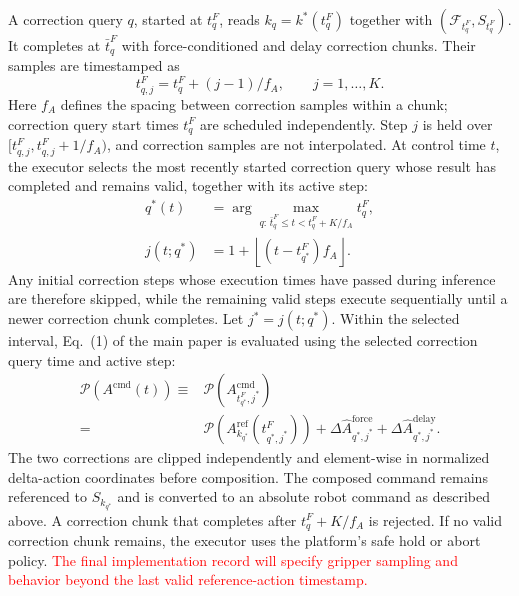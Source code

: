\documentclass[conference]{IEEEtran}
\newcommand{\assumed}[1]{\textcolor{red}{#1}}
\begin{document}
A correction query $q$, started at $t_q^F$, reads $k_q=k^*(t_q^F)$ together with $(\mathcal F_{t_q^F},S_{t_q^F})$. It completes at $\bar t_q^F$ with force-conditioned and delay correction chunks. Their samples are timestamped as
\begin{equation}
    t^F_{q,j}=t_q^F+(j-1)/f_A,
    \qquad j=1,\ldots,K.
    \label{eq:supp_correction_timestamps}
\end{equation}
Here $f_A$ defines the spacing between correction samples within a chunk; correction query start times $t_q^F$ are scheduled independently. Step $j$ is held over $[t^F_{q,j},t^F_{q,j}+1/f_A)$, and correction samples are not interpolated. At control time $t$, the executor selects the most recently started correction query whose result has completed and remains valid, together with its active step:
\begin{equation}
\begin{aligned}
    q^*(t)&=\arg\max_{q:\,\bar t_q^F\leq t<t_q^F+K/f_A}t_q^F,\\
    j(t;q^*)&=1+\left\lfloor(t-t_{q^*}^F)f_A\right\rfloor.
\end{aligned}
    \label{eq:supp_active_correction_step}
\end{equation}
Any initial correction steps whose execution times have passed during inference are therefore skipped, while the remaining valid steps execute sequentially until a newer correction chunk completes. Let $j^*=j(t;q^*)$. Within the selected interval, Eq.~(1) of the main paper is evaluated using the selected correction query time and active step:
\begin{equation}
\begin{aligned}
    \mathcal P(A^{\mathrm{cmd}}(t))
    \equiv{}&\mathcal P(A^{\mathrm{cmd}}_{t_{q^*}^F,j^*})\\
    ={}&\mathcal P\!\left(A_{k_{q^*}}^{\mathrm{ref}}
        (t^F_{q^*,j^*})\right)
      +\Delta\hat A^{\mathrm{force}}_{q^*,j^*}
      +\Delta\hat A^{\mathrm{delay}}_{q^*,j^*}.
\end{aligned}
    \label{eq:supp_active_correction}
\end{equation}
The two corrections are clipped independently and element-wise in normalized delta-action coordinates before composition. The composed command remains referenced to $S_{k_{q^*}}$ and is converted to an absolute robot command as described above. A correction chunk that completes after $t_q^F+K/f_A$ is rejected. If no valid correction chunk remains, the executor uses the platform's safe hold or abort policy. \assumed{The final implementation record will specify gripper sampling and behavior beyond the last valid reference-action timestamp.}
\end{document}
